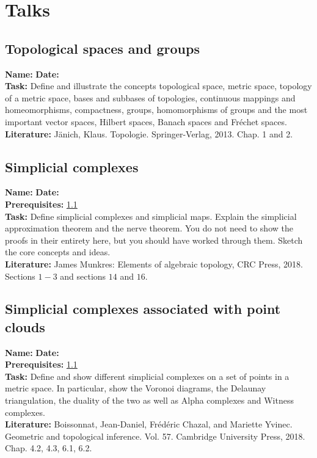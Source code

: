 \documentclass{article}
\begin{document}
\section{Talks}
\subsection{Topological spaces and groups}
\label{top}
\textbf{Name:}  \hspace{4cm} \textbf{Date:} \\
\textbf{Task:} Define and illustrate the concepts topological space, metric space, topology of a metric space, bases and subbases of topologies, continuous mappings and homeomorphisms, compactness, groups, homomorphisms of groups and the most important vector spaces, Hilbert spaces, Banach spaces and Fréchet spaces.\\
\textbf{Literature:} Jänich, Klaus. Topologie. Springer-Verlag, 2013. Chap. 1 and 2.

\subsection{Simplicial complexes}
\label{sim}
\textbf{Name:}  \hspace{4cm} \textbf{Date:} \\
\textbf{Prerequisites:} \ref{top}\\
\textbf{Task:} Define simplicial complexes and simplicial maps. Explain the simplicial approximation theorem and the nerve theorem. You do not need to show the proofs in their entirety here, but you should have worked through them. Sketch the core concepts and ideas.\\
\textbf{Literature:} James Munkres: Elements of algebraic topology, CRC Press, 2018. Sections $1-3$ and sections $14$ and $16$.

\subsection{Simplicial complexes associated with point clouds}
\label{simpoint}
\textbf{Name:}  \hspace{4cm} \textbf{Date:} \\
\textbf{Prerequisites:} \ref{top}\\
\textbf{Task:} Define and show different simplicial complexes on a set of points in a metric space. In particular, show the Voronoi diagrams, the Delaunay triangulation, the duality of the two as well as Alpha complexes and Witness complexes.\\
\textbf{Literature:} Boissonnat, Jean-Daniel, Frédéric Chazal, and Mariette Yvinec. Geometric and topological inference. Vol. 57. Cambridge University Press, 2018. Chap. 4.2, 4.3, 6.1, 6.2.
\end{document}
